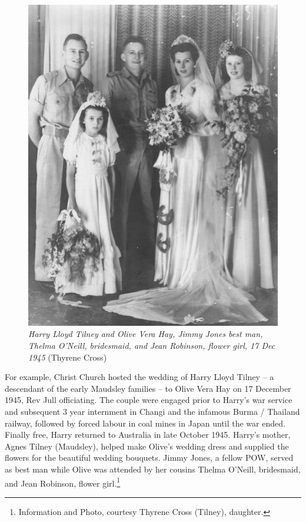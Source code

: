 \begin{figure}
\begin{center}
\includegraphics[width=1.\linewidth,center]{../images/OliveAndSnowTilneyWedding17121945.jpg}
\caption{{\itshape Harry Lloyd Tilney and Olive Vera Hay, Jimmy Jones best man, Thelma O'Neill, bridesmaid, and Jean Robinson, flower girl, 17 Dec 1945} {\scriptsize(Thyrene Cross)}}
\end{center}
\end{figure}




For example, Christ Church hosted the wedding of Harry Lloyd Tilney -- a descendant of the early Maudsley families -- to Olive Vera Hay on 17 December 1945, Rev Jull officiating. The couple were engaged prior to Harry's war service and subsequent 3  year internment in Changi and the infamous Burma / Thailand railway, followed by forced labour in coal mines in Japan until the war ended. Finally free, Harry returned to Australia in late October 1945. Harry's mother, Agnes Tilney (Maudsley), helped make Olive's wedding dress and supplied the flowers for the beautiful wedding bouquets. Jimmy Jones, a fellow POW, served as best man while Olive was attended by her cousins Thelma O'Neill, bridesmaid, and Jean Robinson, flower girl.\footnote{Information and Photo, courtesy Thyrene Cross (Tilney), daughter.}



